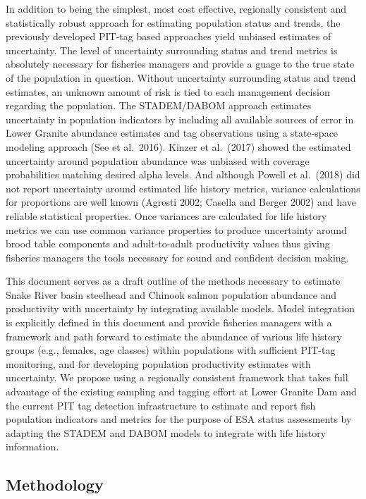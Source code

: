 \documentclass[]{article}
\begin{document}
In addition to being the simplest, most cost effective, regionally
consistent and statistically robust approach for estimating population
status and trends, the previously developed PIT-tag based approaches
yield unbiased estimates of uncertainty. The level of uncertainty
surrounding status and trend metrics is absolutely necessary for
fisheries managers and provide a guage to the true state of the
population in question. Without uncertainty surrounding status and trend
estimates, an unknown amount of risk is tied to each management decision
regarding the population. The STADEM/DABOM approach estimates
uncertainty in population indicators by including all available sources
of error in Lower Granite abundance estimates and tag observations using
a state-space modeling approach (See et al.~2016). Kinzer et al.~(2017)
showed the estimated uncertainty around population abundance was
unbiased with coverage probabilities matching desired alpha levels. And
although Powell et al.~(2018) did not report uncertainty around
estimated life history metrics, variance calculations for proportions
are well known (Agresti 2002; Casella and Berger 2002) and have reliable
statistical properties. Once variances are calculated for life history
metrics we can use common variance properties to produce uncertainty
around brood table components and adult-to-adult productivity values
thus giving fisheries managers the tools necessary for sound and
confident decision making.

This document serves as a draft outline of the methods necessary to
estimate Snake River basin steelhead and Chinook salmon population
abundance and productivity with uncertainty by integrating available
models. Model integration is explicitly defined in this document and
provide fisheries managers with a framework and path forward to estimate
the abundance of various life history groups (e.g., females, age
classes) within populations with sufficient PIT-tag monitoring, and for
developing population productivity estimates with uncertainty. We
propose using a regionally consistent framework that takes full
advantage of the existing sampling and tagging effort at Lower Granite
Dam and the current PIT tag detection infrastructure to estimate and
report fish population indicators and metrics for the purpose of ESA
status assessments by adapting the STADEM and DABOM models to integrate
with life history information.

\hypertarget{methodology}{%
\subsection{Methodology}\label{methodology}}
\end{document}
